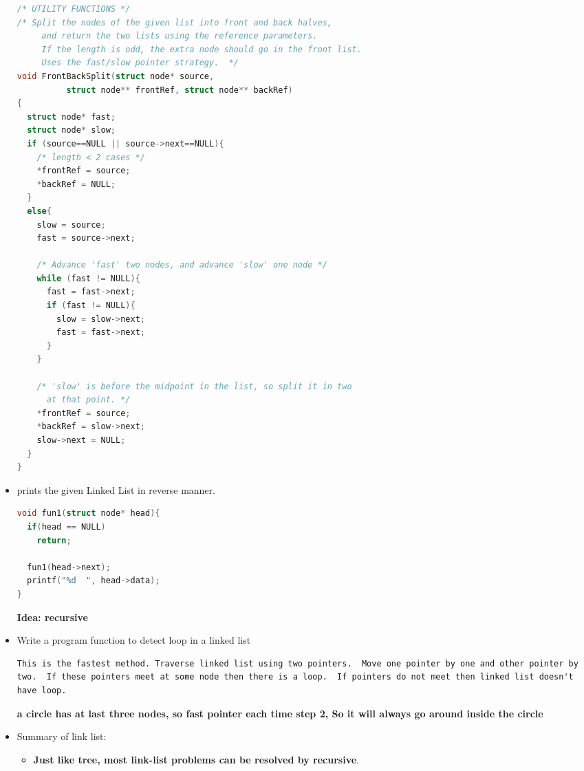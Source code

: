 \documentclass[a4paper,11pt,twoside]{book}
\begin{document}
\begin{itemize}
 
 \begin{lstlisting}[frame=single, language=c++] 
/* UTILITY FUNCTIONS */
/* Split the nodes of the given list into front and back halves,
     and return the two lists using the reference parameters.
     If the length is odd, the extra node should go in the front list.
     Uses the fast/slow pointer strategy.  */
void FrontBackSplit(struct node* source,
          struct node** frontRef, struct node** backRef)
{
  struct node* fast;
  struct node* slow;
  if (source==NULL || source->next==NULL){
    /* length < 2 cases */
    *frontRef = source;
    *backRef = NULL;
  }
  else{
    slow = source;
    fast = source->next;
 
    /* Advance 'fast' two nodes, and advance 'slow' one node */
    while (fast != NULL){
      fast = fast->next;
      if (fast != NULL){
        slow = slow->next;
        fast = fast->next;
      }
    }
 
    /* 'slow' is before the midpoint in the list, so split it in two
      at that point. */
    *frontRef = source;
    *backRef = slow->next;
    slow->next = NULL;
  }
}

\end{lstlisting}


	\item prints the given Linked List in reverse manner. 
\begin{lstlisting}[frame=single, language=c++]
void fun1(struct node* head){
  if(head == NULL)
    return;
  
  fun1(head->next);
  printf("%d  ", head->data);
}
\end{lstlisting}
\textbf{Idea: recursive}


	\item Write a program function to detect loop in a linked list
\begin{lstlisting}[breaklines]
This is the fastest method. Traverse linked list using two pointers.  Move one pointer by one and other pointer by two.  If these pointers meet at some node then there is a loop.  If pointers do not meet then linked list doesn't have loop.
\end{lstlisting}
\textbf{a circle has at last three nodes, so fast pointer each time step 2, So it will always go around inside the circle}

	\item Summary of link list:
\begin{itemize}
\item \textbf{Just like tree, most link-list problems can be resolved by recursive}.


\end{itemize}
\end{itemize}
\end{document}
